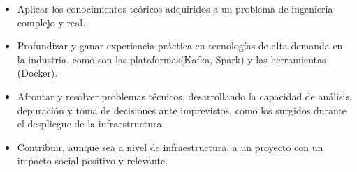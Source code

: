 \begin{itemize}
    \item Aplicar los conocimientos teóricos adquiridos a un problema de ingeniería complejo y real.
    \item Profundizar y ganar experiencia práctica en tecnologías de alta demanda en la industria, como son las plataformas(Kafka, Spark) y las herramientas (Docker).
    \item Afrontar y resolver problemas técnicos, desarrollando la capacidad de análisis, depuración y toma de decisiones ante imprevistos, como los surgidos durante el despliegue de la infraestructura.
    \item Contribuir, aunque sea a nivel de infraestructura, a un proyecto con un impacto social positivo y relevante.
\end{itemize}
